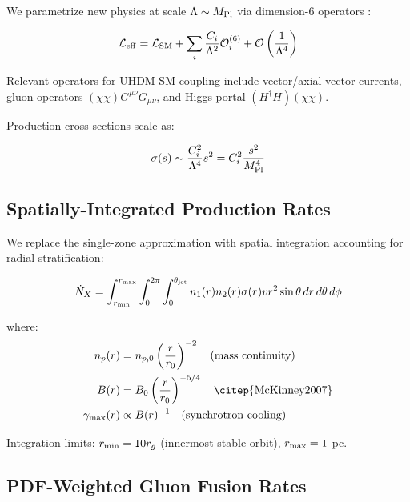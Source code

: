 \documentclass[twocolumn,superscriptaddress,prd,nofootinbib]{revtex4-2}
\begin{document}
We parametrize new physics at scale $\Lambda \sim M_{\rm Pl}$ via dimension-6 operators \citep{Grzadkowski2010}:

\begin{equation}
\mathcal{L}_{\rm eff} = \mathcal{L}_{\rm SM} + \sum_{i} \frac{C_i}{\Lambda^2} \mathcal{O}_i^{(6)} + \mathcal{O}\left(\frac{1}{\Lambda^4}\right)
\label{eq:EFT_Lagrangian}
\end{equation}

Relevant operators for UHDM-SM coupling include vector/axial-vector currents, gluon operators $(\bar{\chi}\chi) G^{\mu\nu} G_{\mu\nu}$, and Higgs portal $(H^\dagger H)(\bar{\chi}\chi)$.

Production cross sections scale as:

\begin{equation}
\sigma(s) \sim \frac{C_i^2}{\Lambda^4} s^2 = C_i^2 \frac{s^2}{M_{\rm Pl}^4}
\label{eq:sigma_EFT}
\end{equation}

\subsection{Spatially-Integrated Production Rates}

We replace the single-zone approximation with spatial integration accounting for radial stratification:

\begin{equation}
\dot{N}_X = \int_{r_{\rm min}}^{r_{\rm max}} \int_0^{2\pi} \int_0^{\theta_{\rm jet}} n_1(r) n_2(r) \sigma(r) v r^2 \sin\theta \, dr\, d\theta\, d\phi
\label{eq:production_rate_integrated}
\end{equation}

where:
\begin{align}
n_p(r) &= n_{p,0} \left(\frac{r}{r_0}\right)^{-2} \quad \text{(mass continuity)} \\
B(r) &= B_0 \left(\frac{r}{r_0}\right)^{-5/4} \quad \text{\citep{McKinney2007}} \\
\gamma_{\rm max}(r) &\propto B(r)^{-1} \quad \text{(synchrotron cooling)}
\end{align}

Integration limits: $r_{\rm min} = 10 r_g$ (innermost stable orbit), $r_{\rm max} = 1$ pc.

\subsection{PDF-Weighted Gluon Fusion Rates}
\end{document}

